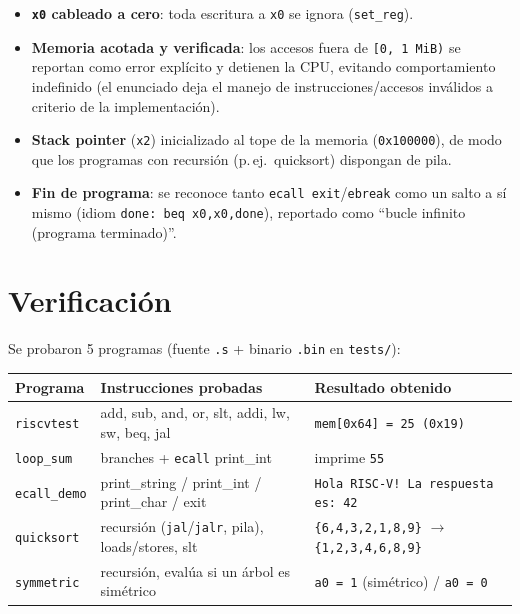 \documentclass[11pt,a4paper]{article}
\newcommand{\code}[1]{\texttt{#1}}
\begin{document}
\begin{itemize}[noitemsep,topsep=2pt]
  \item \textbf{\code{x0} cableado a cero}: toda escritura a \code{x0} se ignora
        (\code{set\_reg}).
  \item \textbf{Memoria acotada y verificada}: los accesos fuera de
        \code{[0, 1\,MiB)} se reportan como error explícito y detienen la CPU,
        evitando comportamiento indefinido (el enunciado deja el manejo de
        instrucciones/accesos inválidos a criterio de la implementación).
  \item \textbf{Stack pointer} (\code{x2}) inicializado al tope de la memoria
        (\code{0x100000}), de modo que los programas con recursión (p.\,ej.\
        quicksort) dispongan de pila.
  \item \textbf{Fin de programa}: se reconoce tanto \code{ecall exit}/\code{ebreak}
        como un salto a sí mismo (idiom \code{done: beq x0,x0,done}), reportado
        como ``bucle infinito (programa terminado)''.
\end{itemize}

\section{Verificación}

Se probaron 5 programas (fuente \code{.s} + binario \code{.bin} en
\code{tests/}):

\begin{center}
\small
\begin{tabular}{@{}p{2.4cm}p{6.4cm}p{4.6cm}@{}}
\toprule
\textbf{Programa} & \textbf{Instrucciones probadas} & \textbf{Resultado obtenido} \\
\midrule
\code{riscvtest} & add, sub, and, or, slt, addi, lw, sw, beq, jal & \code{mem[0x64] = 25 (0x19)} \checkmark \\
\code{loop\_sum} & branches + \code{ecall} print\_int & imprime \code{55} \checkmark \\
\code{ecall\_demo} & print\_string / print\_int / print\_char / exit & \code{Hola RISC-V! La respuesta es: 42} \checkmark \\
\code{quicksort} & recursión (\code{jal}/\code{jalr}, pila), loads/stores, slt & \code{\{6,4,3,2,1,8,9\}} $\rightarrow$ \code{\{1,2,3,4,6,8,9\}} \checkmark \\
\code{symmetric} & recursión, evalúa si un árbol es simétrico & \code{a0 = 1} (simétrico) / \code{a0 = 0} \checkmark \\
\bottomrule
\end{tabular}
\end{center}
\end{document}
